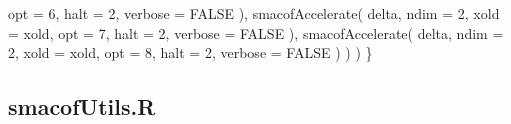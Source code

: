 \documentclass[
  12pt,
  letterpaper,
  DIV=11,
  numbers=noendperiod]{scrartcl}
\newenvironment{Shaded}{\begin{snugshade}}{\end{snugshade}}
\newcommand{\AttributeTok}[1]{\textcolor[rgb]{0.40,0.45,0.13}{#1}}
\newcommand{\ConstantTok}[1]{\textcolor[rgb]{0.56,0.35,0.01}{#1}}
\newcommand{\DecValTok}[1]{\textcolor[rgb]{0.68,0.00,0.00}{#1}}
\newcommand{\FunctionTok}[1]{\textcolor[rgb]{0.28,0.35,0.67}{#1}}
\newcommand{\NormalTok}[1]{\textcolor[rgb]{0.00,0.23,0.31}{#1}}
\begin{document}
\begin{Shaded}
\begin{Highlighting}[]
        \AttributeTok{opt =} \DecValTok{6}\NormalTok{,}
        \AttributeTok{halt =} \DecValTok{2}\NormalTok{,}
        \AttributeTok{verbose =} \ConstantTok{FALSE}
\NormalTok{      ),}
      \FunctionTok{smacofAccelerate}\NormalTok{(}
\NormalTok{        delta,}
        \AttributeTok{ndim =} \DecValTok{2}\NormalTok{,}
        \AttributeTok{xold =}\NormalTok{ xold,}
        \AttributeTok{opt =} \DecValTok{7}\NormalTok{,}
        \AttributeTok{halt =} \DecValTok{2}\NormalTok{,}
        \AttributeTok{verbose =} \ConstantTok{FALSE}
\NormalTok{      ),}
      \FunctionTok{smacofAccelerate}\NormalTok{(}
\NormalTok{        delta,}
        \AttributeTok{ndim =} \DecValTok{2}\NormalTok{,}
        \AttributeTok{xold =}\NormalTok{ xold,}
        \AttributeTok{opt =} \DecValTok{8}\NormalTok{,}
        \AttributeTok{halt =} \DecValTok{2}\NormalTok{,}
        \AttributeTok{verbose =} \ConstantTok{FALSE}
\NormalTok{      )}
\NormalTok{    )}
\NormalTok{  )}
\NormalTok{\}}
\end{Highlighting}
\end{Shaded}

\subsection{smacofUtils.R}\label{smacofutils.r}
\end{document}
